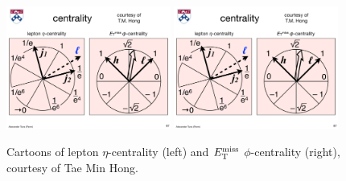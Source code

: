 \begin{figure}[tp]
  \centering
  \includegraphics[width=0.48\textwidth]{figures/backgrounds/cartoon_lepton_eta_centrality}
  \includegraphics[width=0.48\textwidth]{figures/backgrounds/cartoon_met_phi_centrality}
  \caption{Cartoons of lepton $\eta$-centrality (left) and $E_{\mathrm{T}}^{\mathrm{miss}}$ $\phi$-centrality (right), courtesy of Tae Min Hong.}
  \label{fig:strategy-centrality-cartoons}
\end{figure}


